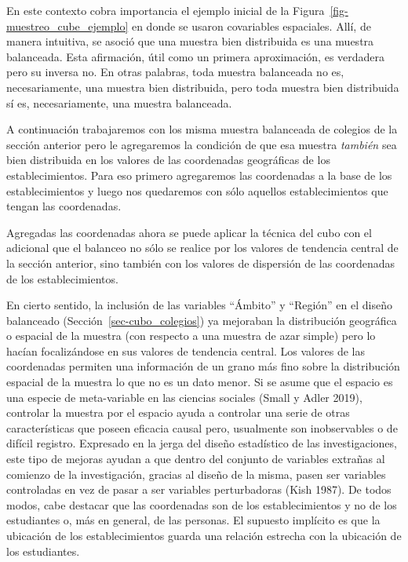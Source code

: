 \documentclass[
  spanish,
  a4paper,
]{scrreprt}
\begin{document}
En este contexto cobra importancia el ejemplo inicial de la
Figura~\ref{fig-muestreo_cube_ejemplo} en donde se usaron covariables
espaciales. Allí, de manera intuitiva, se asoció que una muestra bien
distribuida es una muestra balanceada. Esta afirmación, útil como un
primera aproximación, es verdadera pero su inversa no. En otras
palabras, toda muestra balanceada no es, necesariamente, una muestra
bien distribuida, pero toda muestra bien distribuida sí es,
necesariamente, una muestra balanceada.

A continuación trabajaremos con los misma muestra balanceada de colegios
de la sección anterior pero le agregaremos la condición de que esa
muestra \emph{también} sea bien distribuida en los valores de las
coordenadas geográficas de los establecimientos. Para eso primero
agregaremos las coordenadas a la base de los establecimientos y luego
nos quedaremos con sólo aquellos establecimientos que tengan las
coordenadas.

Agregadas las coordenadas ahora se puede aplicar la técnica del cubo con
el adicional que el balanceo no sólo se realice por los valores de
tendencia central de la sección anterior, sino también con los valores
de dispersión de las coordenadas de los establecimientos.

En cierto sentido, la inclusión de las variables ``Ámbito'' y ``Región''
en el diseño balanceado (Sección~\ref{sec-cubo_colegios}) ya mejoraban
la distribución geográfica o espacial de la muestra (con respecto a una
muestra de azar simple) pero lo hacían focalizándose en sus valores de
tendencia central. Los valores de las coordenadas permiten una
información de un grano más fino sobre la distribución espacial de la
muestra lo que no es un dato menor. Si se asume que el espacio es una
especie de meta-variable en las ciencias sociales (Small y Adler 2019),
controlar la muestra por el espacio ayuda a controlar una serie de otras
características que poseen eficacia causal pero, usualmente son
inobservables o de difícil registro. Expresado en la jerga del diseño
estadístico de las investigaciones, este tipo de mejoras ayudan a que
dentro del conjunto de variables extrañas al comienzo de la
investigación, gracias al diseño de la misma, pasen ser variables
controladas en vez de pasar a ser variables perturbadoras (Kish 1987).
De todos modos, cabe destacar que las coordenadas son de los
establecimientos y no de los estudiantes o, más en general, de las
personas. El supuesto implícito es que la ubicación de los
establecimientos guarda una relación estrecha con la ubicación de los
estudiantes.
\end{document}
